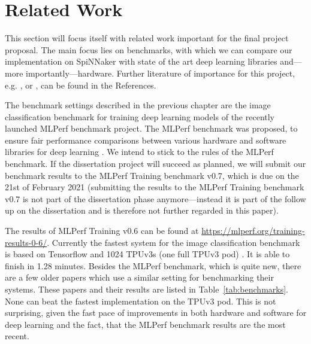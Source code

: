 \documentclass{article}
\begin{document}

\section{Related Work} %
\label{sec:related_work}

This section will focus itself with related work important
for the final project proposal.
The main focus lies on benchmarks, with which we can
compare our implementation on SpiNNaker with state of the
art deep learning libraries and---more importantly---hardware.
Further literature of importance for this project, e.g.
\citet{he_et_al_2015}, \citet{goodfellow2016} or
\citet{imagenet}, can be found in the References.

The benchmark settings described in the previous chapter
are the image classification benchmark for training deep
learning models of the recently launched MLPerf benchmark
project.
The MLPerf benchmark was proposed, to ensure fair
performance comparisons between various hardware and
software libraries for deep learning
\citep{mattson_et_al_2019}.
We intend to stick to the rules of the MLPerf benchmark.
If the dissertation project will succeed as planned, we
will submit our benchmark results to the MLPerf Training
benchmark v0.7, which is due on the 21st of February 2021
(submitting the results to the MLPerf Training benchmark
v0.7 is not part of the dissertation phase
anymore---instead it is part of the follow up on the
dissertation and is therefore not further regarded in this
paper).

The results of MLPerf Training v0.6 can be found at
\url{https://mlperf.org/training-results-0-6/}.
Currently the fastest system for the image classification
benchmark is based on Tensorflow and 1024 TPUv3s (one full
TPUv3 pod) \citep{stone2019}.
It is able to finish in 1.28 minutes.
Besides the MLPerf benchmark, which is quite new, there
are a few older papers which use a similar setting for
benchmarking their systems.
These papers and their results are listed in
Table~\ref{tab:benchmarks}.
None can beat the fastest implementation on the TPUv3 pod.
This is not surprising, given the fast pace of improvements in both
hardware and software for deep learning and the fact, that the
MLPerf benchmark results are the most recent.
\end{document}
